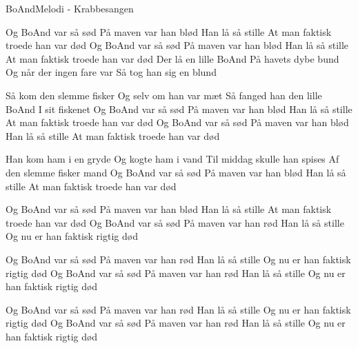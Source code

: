 \begin{sang}{BoAnd}{Melodi - Krabbesangen}
\begin{vers}
Og BoAnd var så sød
På maven var han blød
Han lå så stille
At man faktisk troede han var død
Og BoAnd var så sød
På maven var han blød
Han lå så stille
At man faktisk troede han var død
Der lå en lille BoAnd
På havets dybe bund
Og når der ingen fare var
Så tog han sig en blund
\end{vers}

\begin{vers}
Så kom den slemme fisker
Og selv om han var mæt
Så fanged han den lille BoAnd
I sit fiskenet
Og BoAnd var så sød
På maven var han blød
Han lå så stille
At man faktisk troede han var død
Og BoAnd var så sød
På maven var han blød
Han lå så stille
At man faktisk troede han var død
\end{vers}

\begin{vers}
Han kom ham i en gryde
Og kogte ham i vand
Til middag skulle han spises
Af den slemme fisker mand
Og BoAnd var så sød
På maven var han blød
Han lå så stille
At man faktisk troede han var død
\end{vers}

\begin{vers}
Og BoAnd var så sød
På maven var han blød
Han lå så stille
At man faktisk troede han var død
Og BoAnd var så sød
På maven var han rød
Han lå så stille
Og nu er han faktisk rigtig død
\end{vers}

\begin{vers}
Og BoAnd var så sød
På maven var han rød
Han lå så stille
Og nu er han faktisk rigtig død
Og BoAnd var så sød
På maven var han rød
Han lå så stille
Og nu er han faktisk rigtig død
\end{vers}

\begin{vers}
Og BoAnd var så sød
På maven var han rød
Han lå så stille
Og nu er han faktisk rigtig død
Og BoAnd var så sød
På maven var han rød
Han lå så stille
Og nu er han faktisk rigtig død
\end{vers}
\vbox{}\vfill
\vbox{}\vfill
\vbox{}\vfill
\vbox{}\vfill
\vbox{}\vfill
\vbox{}\vfill
\laps
\end{sang}
